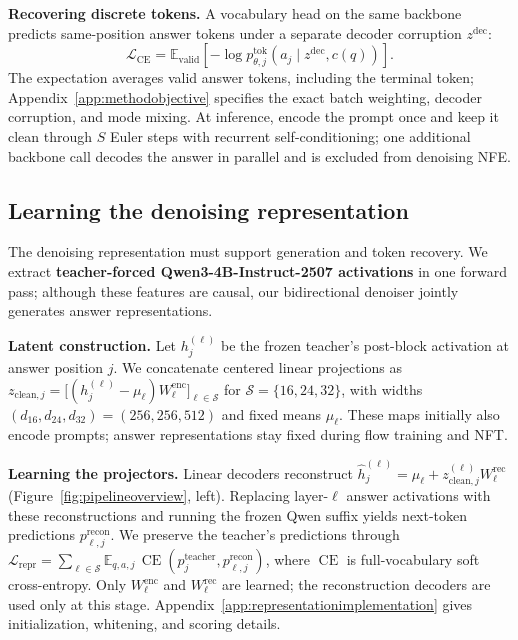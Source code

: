 \documentclass{article}
\newcommand{\E}{\mathbb{E}}
\newcommand{\CE}{\operatorname{CE}}
\begin{document}
\textbf{Recovering discrete tokens.}
A vocabulary head on the same backbone predicts same-position answer tokens under a separate decoder corruption $z^{\mathrm{dec}}$:
\begin{equation}
 \mathcal L_{\mathrm{CE}}
 =\E_{\mathrm{valid}}\!\left[-\log p_{\theta,j}^{\mathrm{tok}}(a_j\mid z^{\mathrm{dec}},c(q))\right].
 \label{eq:methoddecoderloss}
\end{equation}
The expectation averages valid answer tokens, including the terminal token; Appendix~\ref{app:methodobjective} specifies the exact batch weighting, decoder corruption, and mode mixing. At inference, encode the prompt once and keep it clean through $S$ Euler steps with recurrent self-conditioning; one additional backbone call decodes the answer in parallel and is excluded from denoising NFE.

\subsection{Learning the denoising representation}
\label{sec:representation}

The denoising representation must support generation and token recovery. We extract \textbf{teacher-forced Qwen3-4B-Instruct-2507 activations} \citep{qwen2507} in one forward pass; although these features are causal, our bidirectional denoiser jointly generates answer representations.

\textbf{Latent construction.}
\label{sec:representationconstruction}
Let $h_j^{(\ell)}$ be the frozen teacher's post-block activation at answer position $j$. We concatenate centered linear projections as $z_{\mathrm{clean},j}=\big[(h_j^{(\ell)}-\mu_\ell)W_\ell^{\mathrm{enc}}\big]_{\ell\in\mathcal S}$ for $\mathcal S=\{16,24,32\}$, with widths $(d_{16},d_{24},d_{32})=(256,256,512)$ and fixed means $\mu_\ell$. These maps initially also encode prompts; answer representations stay fixed during flow training and NFT.

\textbf{Learning the projectors.}
Linear decoders reconstruct $\widehat h_j^{(\ell)}=\mu_\ell+z_{\mathrm{clean},j}^{(\ell)}W_\ell^{\mathrm{rec}}$ (Figure~\ref{fig:pipelineoverview}, left). Replacing layer-$\ell$ answer activations with these reconstructions and running the frozen Qwen suffix yields next-token predictions $p_{\ell,j}^{\mathrm{recon}}$. We preserve the teacher's predictions through $\mathcal L_{\mathrm{repr}}=\sum_{\ell\in\mathcal S}\E_{q,a,j}\,\CE(p_j^{\mathrm{teacher}},p_{\ell,j}^{\mathrm{recon}})$, where $\CE$ is full-vocabulary soft cross-entropy. Only $W_\ell^{\mathrm{enc}}$ and $W_\ell^{\mathrm{rec}}$ are learned; the reconstruction decoders are used only at this stage. Appendix~\ref{app:representationimplementation} gives initialization, whitening, and scoring details.
\end{document}
